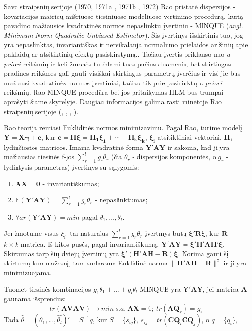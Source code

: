\documentclass[12pt,a4paper]{article}
\begin{document}
\indent Savo straipsnių serijoje (1970\cite{rao1970}, 1971a\cite{rao1971a} , 1971b\cite{rao1971b} , 1972\cite{rao1972}) Rao pristatė dispersijos - kovariacijos matricų mišriuose tiesiniuose modeliuose vertinimo procedūrą, kurią pavadino mažiausios kvadratinės normos nepaslinktu įvertiniu - MINQUE (\textit{angl. Minimum Norm Quadratic Unbiased Estimator}). Šis įvertinys išskirtinis tuo, jog yra nepaslinktas, invariantiškas ir nereikalauja normalumo prielaidos ar žinių apie paklaidų ar atsitiktinių efektų pasiskirstymą.. Tačiau įvertis priklauso nuo \textit{a priori} reikšmių ir keli žmonės turėdami tuos pačius duomenis, bet skirtingas pradines reikšmes gali gauti visiškai skirtingus parametrų įverčius ir visi jie bus mažiausi kvadratinės normos įvertiniai, tačiau tik prie pasirinktų \textit{a priori} reikšmių. Rao MINQUE procedūra bei jos pritaikymas HLM bus trumpai aprašyti šiame skyrelyje. Daugiau informacijos galima rasti minėtoje Rao straipsnių serijoje (\cite{rao1970}, \cite{rao1971a} , \cite{rao1971b} , \cite{rao1972}).

\indent Rao teorija remiasi Euklidinės normos minimizavimu. Pagal Rao, turime modelį $\mathbf{Y}=\mathbf{X}\boldsymbol{\gamma}+\mathbf{e}$, kur $\mathbf{e}=\mathbf{H\boldsymbol{\xi}}=\mathbf{\boldsymbol{H_1\xi_1+\cdots +H_k \xi_k}}$, $\boldsymbol{\xi_i}$-atsitiktiniai vektoriai, $\mathbf{H_i}$-lydinčiosios matricos. Imama kvadratinė forma $\mathbf{Y'AY}$ ir sakoma, kad ji yra mažiausias tiesinės f-jos $\sum^l_{r=1} g_r\theta_r$ (čia $\theta_r$ - dispersijos komponentės, o $g_r$ - lydintysis parametras) įvertinys su sąlygomis:
\begin{enumerate}
\item $\mathbf{AX=0}$ - invariantiškumas;
\item $\mathbb{E}\left(\mathbf{Y'AY}\right)=\sum^l_{r=1} g_r\theta_r$ - nepaslinktumas;
\item $\mathbb{V}ar\left(\mathbf{Y'AY}\right)=min$ pagal $\theta_1, \dots, \theta_l$.
\end{enumerate}

\indent Jei žinotume visus $\xi_i$, tai natūralus $\sum^l_{r=1} g_r\theta_r$ įvertinys būtų $\boldsymbol{\xi'R\xi}$, kur $\mathbf{R}$ - $k\times k$ matrica. Iš kitos pusės, pagal invariantiškumą, $\mathbf{Y'AY=\boldsymbol{\xi'H'AH'\xi}}$. Skirtumas tarp šių dviejų įvertinių yra $\boldsymbol{\xi'\left(H'AH-R\right)\xi}$. Norima gauti šį skirtumą kuo mažesnį, tam sudaroma Euklidinė norma $\|\boldsymbol{H'AH-R}\|^2$ ir ji yra minimizuojama.

\indent Tuomet tiesinės kombinacijos $g_1 \theta_1+\dots+g_l \theta_l$ MINQUE yra $\mathbf{Y'AY}$, jei matrica $\mathbf{A}$ gaunama išsprendus:
\[tr(\mathbf{AVAV}) \to min \ s.a. \ \mathbf{AX} = 0;\ tr(\mathbf{AQ}_r)=g_r\]
\indent Tada $\hat{\theta} = (\hat{\theta_1},\dots,\hat{\theta_l})'=S^{-1}q$, kur $S=\{s_{ij}\}$, $s_{ij}=tr(\mathbf{CQ}_i\mathbf{CQ}_j)$, o
$q=\{q_i\}$,
\end{document}
